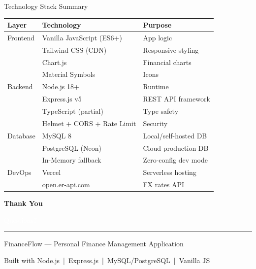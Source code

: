 \documentclass[aspectratio=169, 12pt]{beamer}
\begin{document}
\begin{frame}{Technology Stack Summary}

\begin{center}
\small
\begin{tabular}{l l l}
\toprule
\textbf{Layer} & \textbf{Technology} & \textbf{Purpose} \\
\midrule
\textcolor{primary}{Frontend} & Vanilla JavaScript (ES6+) & App logic \\
& Tailwind CSS (CDN) & Responsive styling \\
& Chart.js & Financial charts \\
& Material Symbols & Icons \\
\midrule
\textcolor{primary}{Backend} & Node.js 18+ & Runtime \\
& Express.js v5 & REST API framework \\
& TypeScript (partial) & Type safety \\
& Helmet + CORS + Rate Limit & Security \\
\midrule
\textcolor{primary}{Database} & MySQL 8 & Local/self-hosted DB \\
& PostgreSQL (Neon) & Cloud production DB \\
& In-Memory fallback & Zero-config dev mode \\
\midrule
\textcolor{primary}{DevOps} & Vercel & Serverless hosting \\
& open.er-api.com & FX rates API \\
\bottomrule
\end{tabular}
\end{center}
\end{frame}

{
\begin{frame}[plain]
\begin{center}
\vspace{2cm}
{\Huge\bfseries\textcolor{primary}{Thank You}}\par
\vspace{12pt}
{\large\textcolor{white}{Questions?}}\par
\vspace{1.5cm}
\textcolor{primary}{\rule{0.3\textwidth}{2pt}}\par
\vspace{1.5cm}
{\normalsize\textcolor{gray!50}{FinanceFlow --- Personal Finance Management Application}}\par
\vspace{8pt}
{\small\textcolor{gray!60}{Built with Node.js \,|\, Express.js \,|\, MySQL/PostgreSQL \,|\, Vanilla JS}}\par
\end{center}
\end{frame}
}

\end{document}
